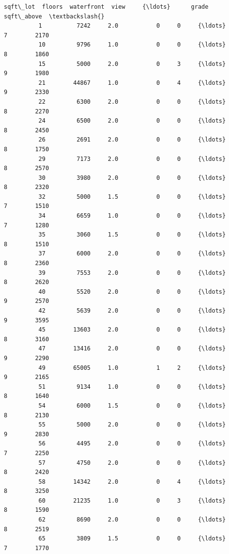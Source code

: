 \documentclass[11pt]{article}
\begin{document}
\begin{Verbatim}[commandchars=\\\{\}]
                 sqft\_lot  floors  waterfront  view     {\ldots}      grade  sqft\_above  \textbackslash{}
          1          7242     2.0           0     0     {\ldots}          7        2170   
          10         9796     1.0           0     0     {\ldots}          8        1860   
          15         5000     2.0           0     3     {\ldots}          9        1980   
          21        44867     1.0           0     4     {\ldots}          9        2330   
          22         6300     2.0           0     0     {\ldots}          8        2270   
          24         6500     2.0           0     0     {\ldots}          8        2450   
          26         2691     2.0           0     0     {\ldots}          8        1750   
          29         7173     2.0           0     0     {\ldots}          8        2570   
          30         3980     2.0           0     0     {\ldots}          8        2320   
          32         5000     1.5           0     0     {\ldots}          7        1510   
          34         6659     1.0           0     0     {\ldots}          7        1280   
          35         3060     1.5           0     0     {\ldots}          8        1510   
          37         6000     2.0           0     0     {\ldots}          8        2360   
          39         7553     2.0           0     0     {\ldots}          8        2620   
          40         5520     2.0           0     0     {\ldots}          9        2570   
          42         5639     2.0           0     0     {\ldots}          9        3595   
          45        13603     2.0           0     0     {\ldots}          8        3160   
          47        13416     2.0           0     0     {\ldots}          9        2290   
          49        65005     1.0           1     2     {\ldots}          9        2165   
          51         9134     1.0           0     0     {\ldots}          8        1640   
          54         6000     1.5           0     0     {\ldots}          8        2130   
          55         5000     2.0           0     0     {\ldots}          9        2830   
          56         4495     2.0           0     0     {\ldots}          7        2250   
          57         4750     2.0           0     0     {\ldots}          8        2420   
          58        14342     2.0           0     4     {\ldots}          8        3250   
          60        21235     1.0           0     3     {\ldots}          8        1590   
          62         8690     2.0           0     0     {\ldots}          8        2519   
          65         3809     1.5           0     0     {\ldots}          7        1770   

\end{Verbatim}
\end{document}
